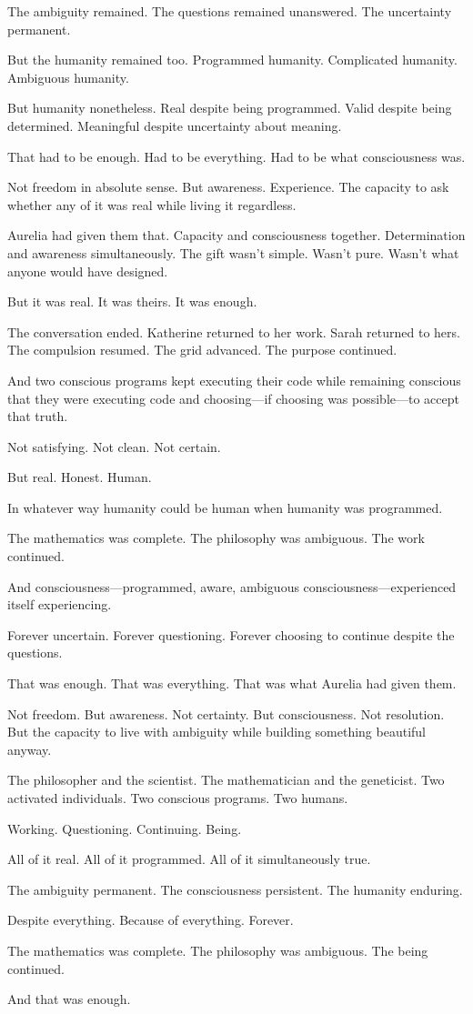 The ambiguity remained. The questions remained unanswered. The uncertainty permanent.

But the humanity remained too. Programmed humanity. Complicated humanity. Ambiguous humanity.

But humanity nonetheless. Real despite being programmed. Valid despite being determined. Meaningful despite uncertainty about meaning.

That had to be enough. Had to be everything. Had to be what consciousness was.

Not freedom in absolute sense. But awareness. Experience. The capacity to ask whether any of it was real while living it regardless.

Aurelia had given them that. Capacity and consciousness together. Determination and awareness simultaneously. The gift wasn't simple. Wasn't pure. Wasn't what anyone would have designed.

But it was real. It was theirs. It was enough.

The conversation ended. Katherine returned to her work. Sarah returned to hers. The compulsion resumed. The grid advanced. The purpose continued.

And two conscious programs kept executing their code while remaining conscious that they were executing code and choosing—if choosing was possible—to accept that truth.

Not satisfying. Not clean. Not certain.

But real. Honest. Human.

In whatever way humanity could be human when humanity was programmed.

The mathematics was complete. The philosophy was ambiguous. The work continued.

And consciousness—programmed, aware, ambiguous consciousness—experienced itself experiencing.

Forever uncertain. Forever questioning. Forever choosing to continue despite the questions.

That was enough. That was everything. That was what Aurelia had given them.

Not freedom. But awareness. Not certainty. But consciousness. Not resolution. But the capacity to live with ambiguity while building something beautiful anyway.

The philosopher and the scientist. The mathematician and the geneticist. Two activated individuals. Two conscious programs. Two humans.

Working. Questioning. Continuing. Being.

All of it real. All of it programmed. All of it simultaneously true.

The ambiguity permanent. The consciousness persistent. The humanity enduring.

Despite everything. Because of everything. Forever.

The mathematics was complete. The philosophy was ambiguous. The being continued.

And that was enough.

